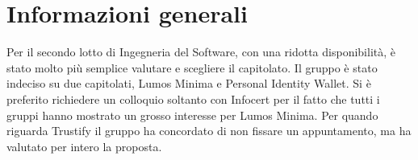 \section*{Informazioni generali}
Per il secondo lotto di Ingegneria del Software, con una ridotta disponibilità, è stato
molto più semplice valutare e scegliere il capitolato. Il gruppo è stato indeciso su due
capitolati, Lumos Minima e Personal Identity Wallet. Si è preferito richiedere un colloquio
soltanto con Infocert per il fatto che tutti i gruppi hanno mostrato un grosso interesse per
Lumos Minima. Per quando riguarda Trustify il gruppo ha concordato di non fissare un
appuntamento, ma ha valutato per intero la proposta.

